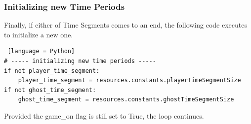 \documentclass[11pt,a4paper,notitlepage]{report}
\begin{document}
				\subsubsection{Initializing new Time Periods}
					Finally, if either of Time Segments comes to an end, the following code executes to initialize a new one.
					\begin{lstlisting} [language = Python]
# ----- initializing new time periods -----
if not player_time_segment:
	player_time_segment = resources.constants.playerTimeSegmentSize
if not ghost_time_segment:
	ghost_time_segment = resources.constants.ghostTimeSegmentSize
					\end{lstlisting}
				Provided the game\_on flag is still set to True, the loop continues.
				\linebreak
				
\end{document}
